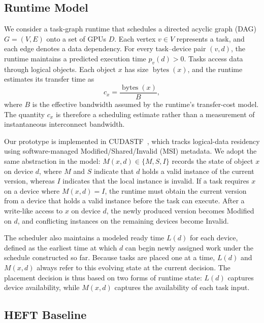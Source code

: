 \documentclass[sigconf]{acmart}
\begin{document}
\subsection{Runtime Model}\label{sec:runtime-model}

We consider a task-graph runtime that schedules a directed acyclic graph (DAG) \(G=(V,E)\) onto a set of GPUs \(D\). Each vertex \(v\in V\) represents a task, and each edge denotes a data dependency. For every task--device pair \((v,d)\), the runtime maintains a predicted execution time \(p_v(d)>0\). Tasks access data through logical objects. Each object \(x\) has size \(\operatorname{bytes}(x)\), and the runtime estimates its transfer time as
\[
c_x=\frac{\operatorname{bytes}(x)}{B},
\]
where \(B\) is the effective bandwidth assumed by the runtime's transfer-cost model. The quantity \(c_x\) is therefore a scheduling estimate rather than a measurement of instantaneous interconnect bandwidth.

Our prototype is implemented in CUDASTF~\citep{augonnet2024cudastf}, which tracks logical-data residency using software-managed Modified/\allowbreak Shared/\allowbreak Invalid (MSI) metadata. We adopt the same abstraction in the model: \(M(x,d)\in\{M,S,I\}\) records the state of object \(x\) on device \(d\), where \(M\) and \(S\) indicate that \(d\) holds a valid instance of the current version, whereas \(I\) indicates that the local instance is invalid. If a task requires \(x\) on a device where \(M(x,d)=I\), the runtime must obtain the current version from a device that holds a valid instance before the task can execute. After a write-like access to \(x\) on device \(d\), the newly produced version becomes Modified on \(d\), and conflicting instances on the remaining devices become Invalid.

The scheduler also maintains a modeled ready time \(L(d)\) for each device, defined as the earliest time at which \(d\) can begin newly assigned work under the schedule constructed so far. Because tasks are placed one at a time, \(L(d)\) and \(M(x,d)\) always refer to this evolving state at the current decision. The placement decision is thus based on two forms of runtime state: \(L(d)\) captures device availability, while \(M(x,d)\) captures the availability of each task input.

\subsection{HEFT Baseline}\label{sec:heft-baseline}
\end{document}
